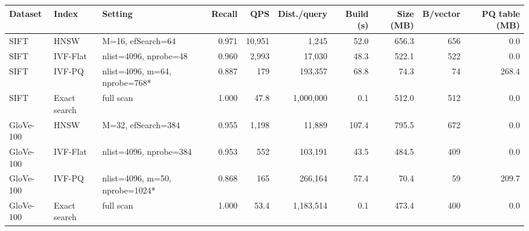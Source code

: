 \begin{tabular}{lllrrrrrrr}
\toprule
Dataset & Index & Setting & Recall & QPS & Dist./query & Build (s) & Size (MB) & B/vector & PQ table (MB) \\
\midrule
SIFT & HNSW & M=16, efSearch=64 & 0.971 & 10,951 & 1,245 & 52.0 & 656.3 & 656 & 0.0 \\
SIFT & IVF-Flat & nlist=4096, nprobe=48 & 0.960 & 2,993 & 17,030 & 48.3 & 522.1 & 522 & 0.0 \\
SIFT & IVF-PQ & nlist=4096, m=64, nprobe=768* & 0.887 & 179 & 193,357 & 68.8 & 74.3 & 74 & 268.4 \\
SIFT & Exact search & full scan & 1.000 & 47.8 & 1,000,000 & 0.1 & 512.0 & 512 & 0.0 \\
GloVe-100 & HNSW & M=32, efSearch=384 & 0.955 & 1,198 & 11,889 & 107.4 & 795.5 & 672 & 0.0 \\
GloVe-100 & IVF-Flat & nlist=4096, nprobe=384 & 0.953 & 552 & 103,191 & 43.5 & 484.5 & 409 & 0.0 \\
GloVe-100 & IVF-PQ & nlist=4096, m=50, nprobe=1024* & 0.868 & 165 & 266,164 & 57.4 & 70.4 & 59 & 209.7 \\
GloVe-100 & Exact search & full scan & 1.000 & 53.4 & 1,183,514 & 0.1 & 473.4 & 400 & 0.0 \\
\bottomrule
\end{tabular}
